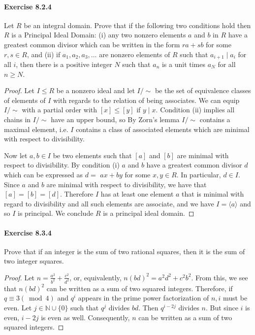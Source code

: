 \documentclass{article}
\theoremstyle{definition}
\begin{document}
\paragraph{Exercise 8.2.4} Let $R$ be an integral domain. Prove that if the following two conditions hold then $R$ is a Principal Ideal Domain: (i) any two nonzero elements $a$ and $b$ in $R$ have a greatest common divisor which can be written in the form $r a+s b$ for some $r, s \in R$, and (ii) if $a_{1}, a_{2}, a_{3}, \ldots$ are nonzero elements of $R$ such that $a_{i+1} \mid a_{i}$ for all $i$, then there is a positive integer $N$ such that $a_{n}$ is a unit times $a_{N}$ for all $n \geq N$.
\begin{proof}
    Let $I \leq R$ be a nonzero ideal and let $I / \sim$ be the set of equivalence classes of elements of $I$ with regards to the relation of being associates. We can equip $I / \sim$ with a partial order with $[x] \leq[y]$ if $y \mid x$. Condition (ii) implies all chains in $I / \sim$ have an upper bound, so By Zorn's lemma $I / \sim$ contains a maximal element, i.e. $I$ contains a class of associated elements which are minimal with respect to divisibility.

Now let $a, b \in I$ be two elements such that $[a]$ and $[b]$ are minimal with respect to divisibility. By condition (i) $a$ and $b$ have a greatest common divisor $d$ which can be expressed as $d=$ $a x+b y$ for some $x, y \in R$. In particular, $d \in I$. Since $a$ and $b$ are minimal with respect to divisibility, we have that $[a]=[b]=[d]$. Therefore $I$ has at least one element $a$ that is minimal with regard to divisibility and all such elements are associate, and we have $I=\langle a\rangle$ and so $I$ is principal. We conclude $R$ is a principal ideal domain.
\end{proof}



\paragraph{Exercise 8.3.4} Prove that if an integer is the sum of two rational squares, then it is the sum of two integer squares.
\begin{proof}
    Let $n=\frac{a^2}{b^2}+\frac{c^2}{d^2}$, or, equivalently, $n(b d)^2=a^2 d^2+c^2 b^2$. From this, we see that $n(b d)^2$ can be written as a sum of two squared integers. Therefore, if $q \equiv 3(\bmod 4)$ and $q^i$ appears in the prime power factorization of $n, i$ must be even. Let $j \in \mathbb{N} \cup\{0\}$ such that $q^j$ divides $b d$. Then $q^{i-2 j}$ divides $n$. But since $i$ is even, $i-2 j$ is even as well. Consequently, $n$ can be written as a sum of two squared integers.
\end{proof}
\end{document}
